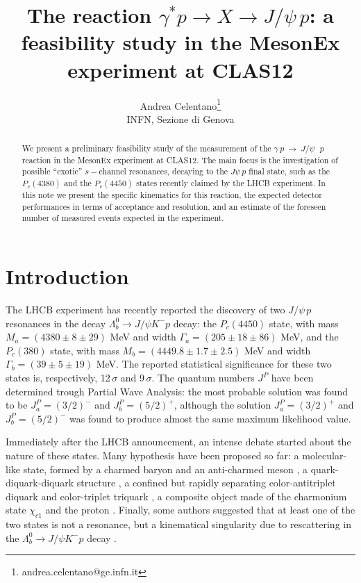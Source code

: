 \documentclass[a4paper,10pt]{article}
\author{Andrea Celentano\thanks{andrea.celentano@ge.infn.it}\\ \small{INFN, Sezione di Genova}}
\title{The reaction $\gamma^* p \rightarrow X \rightarrow J/\psi \, p$: a feasibility study in the MesonEx experiment at CLAS12}
\begin{document}
\maketitle
\begin{abstract}
We present a preliminary feasibility study of the measurement of the  $\gamma~p~\rightarrow~J/\psi~\,~p$ reaction in the MesonEx experiment at CLAS12. The main focus is the investigation of possible ``exotic'' $s-$channel resonances, decaying to the $J\psi \, p$ final state, such as the $P_c(4380)$ and the $P_c(4450)$ states recently claimed by the LHCB experiment. In this note we present the specific kinematics for this reaction, the expected detector performances in terms of acceptance and resolution, and an estimate of the foreseen number of measured events expected in the experiment.
\end{abstract}
\section{Introduction}

The LHCB experiment has recently reported \cite{Aaij:2015tga} the discovery of two $J/\psi \, p$ resonances in the decay $\Lambda^0_b\rightarrow J/\psi K^- p$ decay: the $P_c(4450)$ state, with mass $M_a=(4380 \pm 8 \pm 29)$ MeV and width $\Gamma_a=(205\pm18 \pm86)$ MeV, and the $P_c(380)$ state, with mass $M_b=(4449.8\pm1.7\pm2.5)$ MeV and width $\Gamma_b=(39\pm5\pm19)$ MeV. The reported statistical significance for these two states is, respectively, 12$\,\sigma$ and 9$\, \sigma$. The quantum numbers $J^P$ have been determined trough Partial Wave Analysis: the most probable solution was found to be $J^P_a=(3/2)^-$ and $J^P_b=(5/2)^+$, although the solution $J^P_a=(3/2)^+$ and $J^P_b=(5/2)^-$ was found to produce almost the same maximum likelihood value.

Immediately after the LHCB announcement, an intense debate started about the nature of these states. Many hypothesis have been proposed so far: a molecular-like state, formed by a charmed baryon and an anti-charmed meson  \cite{Chen:2015loa,Chen:2015moa,Roca:2015dva,He:2015cea}, a quark-diquark-diquark structure \cite{Maiani:2015vwa,Anisovich:2015cia}, a confined but rapidly separating color-antitriplet diquark and color-triplet triquark \cite{Lebed:2015tna}, a composite object made of the charmonium state $\chi_{c1}$ and the proton \cite{Meissner:2015mza}. Finally, some authors suggested that at least one of the two states is not a resonance, but a kinematical singularity due to rescattering in the  $\Lambda^0_b\rightarrow J/\psi K^- p$ decay \cite{Guo:2015umn,Liu:2015fea,Mikhasenko:2015vca}.
\end{document}

